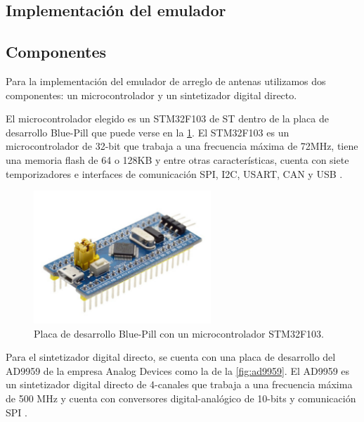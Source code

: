 \documentclass{article}
\newenvironment{standalone}{\begin{preview}}{\end{preview}}
\begin{document}
\begin{standalone}
  \section{Implementación del emulador}

  \subsection{Componentes}

  Para la implementación del emulador de arreglo de antenas utilizamos dos componentes: un microcontrolador y un sintetizador digital directo.

  El microcontrolador elegido es un STM32F103 de ST dentro de la placa de desarrollo Blue-Pill que puede verse en la \cref{fig:blue-pill}.
  El STM32F103 es un microcontrolador de 32-bit que trabaja a una frecuencia máxima de 72MHz, tiene una memoria flash de 64 o 128KB y entre otras características, cuenta con siete temporizadores e interfaces de comunicación SPI, I2C, USART, CAN y USB \cite{STM32F103_datasheet}.

  \begin{figure}[!htbp]
    \centering
    \includegraphics[width=\linewidth, height=50mm, keepaspectratio]{../images/bluepill-stm32.jpg}
    \caption{Placa de desarrollo Blue-Pill con un microcontrolador STM32F103.}
    \label{fig:blue-pill}
  \end{figure}

  Para el sintetizador digital directo, se cuenta con una placa de desarrollo del AD9959 de la empresa Analog Devices como la de la \cref{fig:ad9959}.
  El AD9959 es un sintetizador digital directo de 4-canales que trabaja a una frecuencia máxima de 500 MHz y cuenta con conversores digital-analógico de 10-bits y comunicación SPI \cite{ad9959_datasheet}.


\end{standalone}
\end{document}
